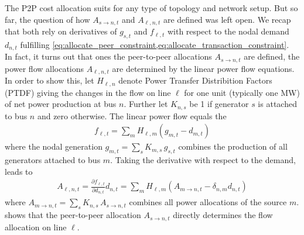 \documentclass[11pt,twocolumn]{article}
\newcommand{\pdv}[2]{\frac{\partial #1}{\partial #2}}
\newcommand{\generation}{g_{s,t}}
\newcommand{\nodalgeneration}[1][n]{g_{#1,t}}
\newcommand{\demand}[1][n]{d_{#1,t}}
\newcommand{\incidenceGenerators}[1][n]{K_{#1,s}}
\newcommand{\ptdf}[1][n]{H_{\ell,#1}}
\newcommand{\flow}{f_{\ell,t}}
\newcommand{\allocatePeer}[1][s \rightarrow n]{A_{#1,t}}
\newcommand{\allocateFlow}[1][n]{A_{\ell,#1,t}}
\begin{document}
The P2P cost allocation suits for any type of topology and network setup. But so far, the question of how $\allocatePeer$ and $\allocateFlow$ are defined was left open. We recap that both rely on derivatives of $\generation$ and $\flow$  with respect to the nodal demand $\demand$ fulfilling \cref{eq:allocate_peer_constraint,eq:allocate_transaction_constraint}. \\
% 
In fact, it turns out that ones the peer-to-peer allocations $\allocatePeer$ are defined, the power flow allocations $\allocateFlow$ are determined by the linear power flow equations.
In order to show this, let $\ptdf$ denote Power Transfer Distribition Factors (PTDF) giving the changes in the flow on line $\ell$ for one unit (typically one MW) of net power production at bus $n$.  Further let $\incidenceGenerators$ be 1 if generator $s$ is attached to bus $n$ and zero otherwise. The linear power flow equals the 
\begin{align}
 \flow  = \sum_m \ptdf[m] \left( \nodalgeneration[m] - \demand[m] \right)  
\end{align}
where the nodal generation $\nodalgeneration[m] = \sum_s \incidenceGenerators[m] \, \generation $ combines the production of all generators attached to bus $m$. Taking the derivative with respect to the demand, leads to 
\begin{align}
 \allocateFlow = \pdv{\flow}{\demand} \demand = \sum_m \ptdf[m] \left( \allocatePeer[m \rightarrow n]  - \delta_{n,m} \demand \right) 
 \label{eq:allocate_peer_to_allocate_flow}
\end{align}
where $\allocatePeer[m \rightarrow n] = \sum_s \incidenceGenerators \, \allocatePeer$ combines all power allocations of the source $m$.  shows that the peer-to-peer allocation $\allocatePeer$ directly determines the flow allocation on line $\ell$.
\end{document}
